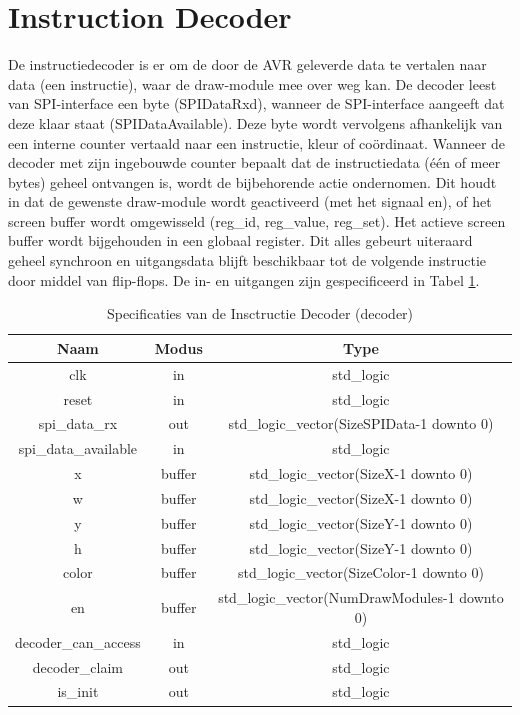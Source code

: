 \documentclass{scrreprt} %
\begin{document}
\section{Instruction Decoder}
De instructiedecoder is er om de door de AVR geleverde data te vertalen naar data (een instructie), waar de draw-module mee over weg kan.
De decoder leest van SPI-interface een byte (SPIDataRxd), wanneer de SPI-interface aangeeft dat deze klaar staat (SPIDataAvailable).
Deze byte wordt vervolgens afhankelijk van een interne counter vertaald naar een instructie, kleur of coördinaat.
Wanneer de decoder met zijn ingebouwde counter bepaalt dat de instructiedata (één of meer bytes) geheel ontvangen is, wordt de bijbehorende actie ondernomen.
Dit houdt in dat de gewenste draw-module wordt geactiveerd (met het signaal en), of het screen buffer wordt omgewisseld (reg\_id, reg\_value, reg\_set).
Het actieve screen buffer wordt bijgehouden in een globaal register.
Dit alles gebeurt uiteraard geheel synchroon en uitgangsdata blijft beschikbaar tot de volgende instructie door middel van flip-flops.
De in- en uitgangen zijn gespecificeerd in Tabel \ref{tab:spec-decoder}.

\begin{table}[H]
\centering
\caption{Specificaties van de Insctructie Decoder (decoder)}
\label{tab:spec-decoder}
\begin{tabular}{c c c}
	\hline\hline
 	Naam & Modus & Type\\
 	\hline
	clk & in & std\_logic \\
	reset & in & std\_logic \\	
	spi\_data\_rx & out & std\_logic\_vector(SizeSPIData-1 downto 0) \\
	spi\_data\_available & in & std\_logic \\
	x &  buffer & std\_logic\_vector(SizeX-1 downto 0) \\
	w &  buffer & std\_logic\_vector(SizeX-1 downto 0) \\
	y &  buffer & std\_logic\_vector(SizeY-1 downto 0) \\
	h &  buffer & std\_logic\_vector(SizeY-1 downto 0) \\
	color &  buffer & std\_logic\_vector(SizeColor-1 downto 0) \\
	en & buffer & std\_logic\_vector(NumDrawModules-1 downto 0)\\
	decoder\_can\_access & in & std\_logic \\
	decoder\_claim & out & std\_logic \\
	is\_init & out & std\_logic \\
  	\hline
\end{tabular}
\end{table}
\end{document}
